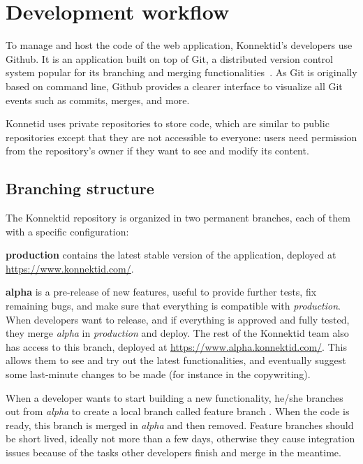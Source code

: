 \section{Development workflow}
\label{sec:github}

To manage and host the code of the web application, Konnektid's developers use Github. It is an application built on top of Git, a distributed version control system popular for its branching and merging functionalities~\cite{git}. As Git is originally based on command line, Github provides a clearer interface to visualize all Git events such as commits, merges, and more. 

Konnetid uses private repositories to store code, which are similar to public repositories except that they are not accessible to everyone: users need permission from the repository's owner if they want to see and modify its content.

\subsection{Branching structure}
\label{ssec:repo}

The Konnektid repository is organized in two permanent branches, each of them with a specific configuration: 

\textbf{production} contains the latest stable version of the application, deployed at \url{https://www.konnektid.com/}.

\textbf{alpha} is a pre-release of new features, useful to provide further tests, fix remaining bugs, and make sure that everything is compatible with \textit{production}. When developers want to release, and if everything is approved and fully tested, they merge \textit{alpha} in \textit{production} and deploy.  The rest of the Konnektid team also has access to this branch, deployed at \url{https://www.alpha.konnektid.com/}. This allows them to see and try out the latest functionalities, and eventually suggest some last-minute changes to be made (for instance in the copywriting).

When a developer wants to start building a new functionality, he/she branches out from \textit{alpha} to create a local branch called \guillemotleft{} feature branch \guillemotright{}. When the code is ready, this branch is merged in \textit{alpha} and then removed. Feature branches should be short lived, ideally not more than a few days, otherwise they cause integration issues because of the tasks other developers finish and merge in the meantime.

